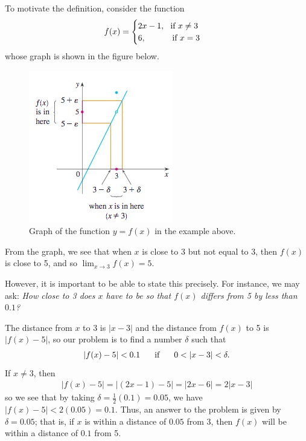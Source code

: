 \documentclass[12pt,letterpaper,reqno]{article}
\numberwithin{equation}{section}
\begin{document}
{To motivate the definition, consider the function
\begin{align*}
	f(x)=\begin{cases}
		2x-1, \ \text{ if } x \neq 3 \\
		6, \hspace{1.0cm} \text{ if } x = 3 \\
	\end{cases}
\end{align*}
whose graph is shown in the figure below.

\begin{figure}[h]\label{fig:lim_def}
	\begin{center}
		\includegraphics[scale=0.7]{figures_mvc/graph_limit_defn}
	\end{center}
	\caption{Graph of the function $y=f(x)$ in the example above.}
\end{figure}
From the graph, we see that when $x$ is close to 3 but not equal to 3, then $f(x)$ is close to 5, and so $\lim_{x \to 3}f(x)=5$.

However, it is important to be able to state this precisely. For instance, we may ask: \emph{How close to 3 does $x$ have to be so that $f(x)$ differs from 5 by less than $0.1$?}

The distance from $x$ to $3$ is $|x-3|$ and the distance from $f(x)$ to 5 is $|f(x)-5|$, so our problem is to find a number $\delta$ such that 
\begin{align*}
	|f(x)-5|<0.1 \hspace{0.5cm} \text{ if } \hspace{0.5cm} 0<|x-3|<\delta.
\end{align*}
If $x \neq 3$, then 
\begin{align*}
	|f(x)-5|=|(2x-1)-5|=|2x-6|=2|x-3|
\end{align*}
so we see that by taking $\delta=\frac{1}{2}(0.1)=0.05$, we have $|f(x)-5|<2(0.05)=0.1$. Thus, an answer to the problem is given by $\delta=0.05$; that is, if $x$ is within a distance of $0.05$ from 3, then $f(x)$ will be within a distance of $0.1$ from 5.

}
\end{document}
